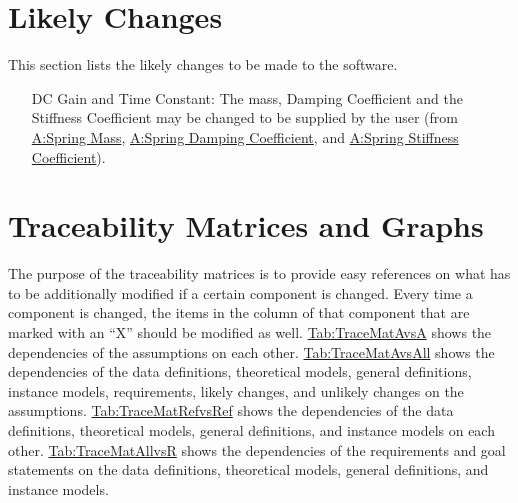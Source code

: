 \documentclass[12pt]{article}
\begin{document}
\section{Likely Changes}
\label{Sec:LCs}
This section lists the likely changes to be made to the software.

\begin{itemize}
\item[DC Gain and Time Constant:\phantomsection\label{likeChgPP}]{The mass, Damping Coefficient and the Stiffness Coefficient may be changed to be supplied by the user (from \hyperref[massSpring]{A:Spring Mass}, \hyperref[dampingCoeffSpring]{A:Spring Damping Coefficient}, and \hyperref[stiffnessCoeffSpring]{A:Spring Stiffness Coefficient}).}
\end{itemize}
\section{Traceability Matrices and Graphs}
\label{Sec:TraceMatrices}
The purpose of the traceability matrices is to provide easy references on what has to be additionally modified if a certain component is changed. Every time a component is changed, the items in the column of that component that are marked with an ``X'' should be modified as well. \hyperref[Table:TraceMatAvsA]{Tab:TraceMatAvsA} shows the dependencies of the assumptions on each other. \hyperref[Table:TraceMatAvsAll]{Tab:TraceMatAvsAll} shows the dependencies of the data definitions, theoretical models, general definitions, instance models, requirements, likely changes, and unlikely changes on the assumptions. \hyperref[Table:TraceMatRefvsRef]{Tab:TraceMatRefvsRef} shows the dependencies of the data definitions, theoretical models, general definitions, and instance models on each other. \hyperref[Table:TraceMatAllvsR]{Tab:TraceMatAllvsR} shows the dependencies of the requirements and goal statements on the data definitions, theoretical models, general definitions, and instance models.
\end{document}
